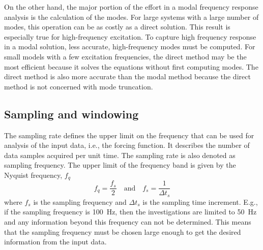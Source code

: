 On the other hand, the major portion of the effort in a modal frequency response
analysis is the calculation of the modes.
For large systems with a large number of modes, this operation can be as
costly as a direct solution.
This result is especially true for high-frequency excitation.
To capture high frequency response in a modal solution, less accurate,
high-frequency modes must be computed.
For small models with a few excitation frequencies, the direct method may be the
most efficient because it solves the equations without first computing modes.
The direct method is also more accurate than the modal method because the direct
method is not concerned with mode truncation.

\subsection{Sampling and windowing}
\label{subs:Sampling and windowing}

The sampling rate defines the upper limit on the frequency that can be
used for analysis of the input data, i.e., the forcing function.
It describes the number of data samples acquired per unit time.
The sampling rate is also denoted as sampling frequency.
The upper limit of the frequency band is given by the Nyquist frequency, $f_q$
%
\begin{equation}
f_q = \frac{f_s}{2} \quad\mbox{and}\quad f_s = \frac{1}{\Delta t_s}
\end{equation}
%
where $f_s$ is the sampling frequency
and $\Delta t_s$ is the sampling time increment.
E.g., if the sampling frequency is 100~Hz, then the investigations are limited
to 50~Hz and any information beyond this frequency can not be determined.
This means that the sampling frequency must be chosen large enough
to get the desired information from the input data.

